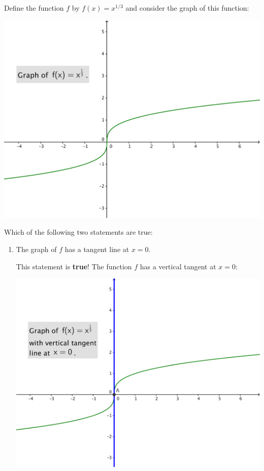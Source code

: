 \documentclass[nooutcomes]{ximera}
\begin{document}
	
\begin{problem}
  Define the function $f$ by $f(x) = x^{1/3}$ and consider the graph of this function:
  \begin{image}
    \includegraphics[scale = 0.4]{figure6.png}
  \end{image}

  Which of the following two statements are true:
  \begin{enumerate}
     \item The graph of $f$ has a tangent line at $x = 0$.
      \begin{freeResponse}
        This statement is \textbf{true}!
        The function $f$ has a vertical tangent at $x = 0$:
        \begin{image}
          \includegraphics[scale = 0.4]{figure7.png}
        \end{image}
      \end{freeResponse}


\end{enumerate}
\end{problem}
\end{document}
